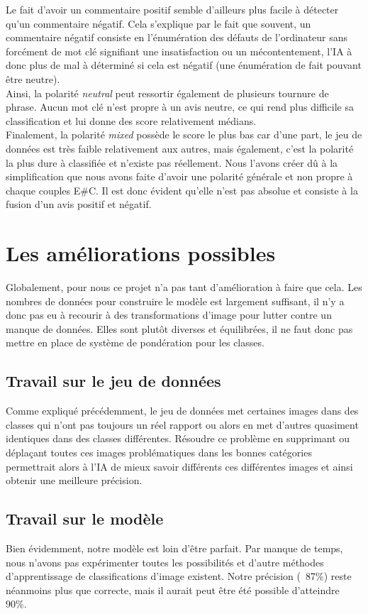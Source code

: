 \documentclass[12pt ,a4paper ]{article}
\begin{document}
\begin{multicols}{2}
Le fait d'avoir un commentaire positif semble d'ailleurs plus facile à détecter qu'un commentaire négatif. Cela s'explique par le fait que souvent, un commentaire négatif consiste en l'énumération des défauts de l'ordinateur sans forcément de mot clé signifiant une insatisfaction ou un mécontentement, l'IA à donc plus de mal à déterminé si cela est négatif (une énumération de fait pouvant être neutre). \\

Ainsi, la polarité \textit{neutral} peut ressortir également de plusieurs tournure de phrase. Aucun mot clé n'est propre à un avis neutre, ce qui rend plus difficile sa classification et lui donne des score relativement médians. \\

Finalement, la polarité \textit{mixed} possède le score le plus bas car d'une part, le jeu de données est très faible relativement aux autres, mais également, c'est la polarité la plus dure à classifiée et n'existe pas réellement. Nous l'avons créer dû à la simplification que nous avons faite d'avoir une polarité générale et non propre à chaque couples E\#C. Il est donc évident qu'elle n'est pas absolue et consiste à la fusion d'un avis positif et négatif. 

\newpage
\section{Les améliorations possibles}
Globalement, pour nous ce projet n'a pas tant d'amélioration à faire que cela. Les nombres de données pour construire le modèle est largement suffisant, il n'y a donc pas eu à recourir à des transformations d'image pour lutter contre un manque de données. Elles sont plutôt diverses et équilibrées, il ne faut donc pas mettre en place de système de pondération pour les classes.\\

\subsection{Travail sur le jeu de données}
Comme expliqué précédemment, le jeu de données met certaines images dans des classes qui n'ont pas toujours un réel rapport ou alors en met d'autres quasiment identiques dans des classes différentes. Résoudre ce problème en supprimant ou déplaçant toutes ces images problématiques dans les bonnes catégories permettrait alors à l'IA de mieux savoir différents ces différentes images et ainsi obtenir une meilleure précision. 

\subsection{Travail sur le modèle}
Bien évidemment, notre modèle est loin d'être parfait. Par manque de temps, nous n'avons pas expérimenter toutes les possibilités et d'autre méthodes d'apprentissage de classifications d'image existent. Notre précision (~87\%)  reste néanmoins plus que correcte, mais il aurait peut être été possible d'atteindre 90\%. 

\end{multicols}
\newpage
\end{document}
